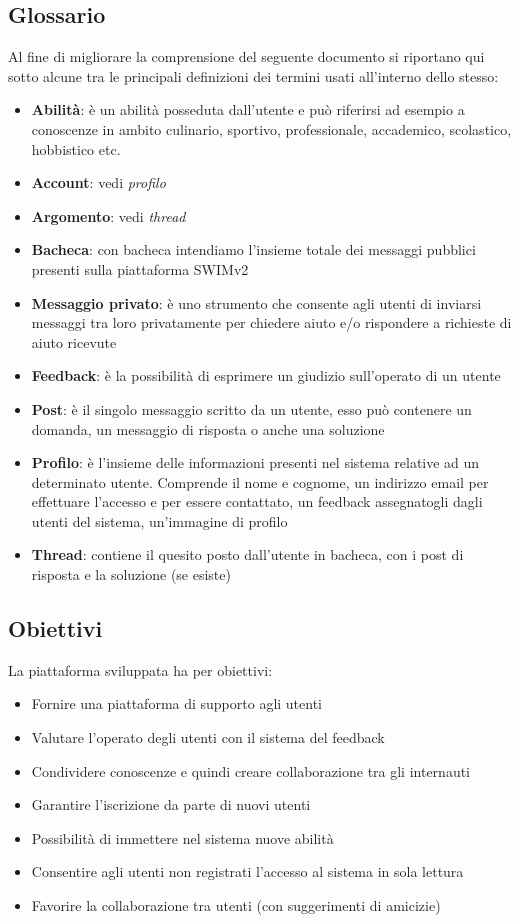 \documentclass[a4paper,12pt]{article}
\begin{document}
\subsection{Glossario}
Al fine di migliorare la comprensione del seguente documento si riportano qui sotto alcune tra le principali definizioni dei termini usati all’interno dello stesso:
\begin{itemize}
\itemsep0em
\item {\bfseries Abilità}:
è un abilità posseduta dall’utente e può riferirsi ad esempio a conoscenze in ambito culinario, sportivo, professionale, accademico, scolastico, hobbistico etc.
\item {\bfseries Account}: vedi \textit{profilo}
\item {\bfseries Argomento}: vedi \textit{thread}
\item {\bfseries Bacheca}:
con bacheca intendiamo l’insieme totale dei messaggi pubblici presenti sulla piattaforma SWIMv2
\item {\bfseries Messaggio privato}:
è uno strumento che consente agli utenti di inviarsi messaggi tra loro privatamente per chiedere aiuto e/o rispondere a richieste di aiuto ricevute
\item {\bfseries Feedback}:
è la possibilità di esprimere un giudizio sull’operato di un utente
\item {\bfseries Post}:
è il singolo messaggio scritto da un utente, esso può contenere un domanda, un messaggio di risposta o anche una soluzione
\item {\bfseries Profilo}:
è l’insieme delle informazioni presenti nel sistema relative ad un determinato utente. Comprende il nome e cognome, un indirizzo email per effettuare l’accesso e per essere contattato, un feedback assegnatogli dagli utenti del sistema, un’immagine di profilo
\item {\bfseries Thread}:
contiene il quesito posto dall’utente in bacheca, con i post di risposta e la soluzione (se esiste)
\end{itemize}

\subsection{Obiettivi}
La piattaforma sviluppata ha per obiettivi:
\begin{itemize}
\itemsep0em
\item Fornire una piattaforma di supporto agli utenti
\item Valutare l’operato degli utenti con il sistema del feedback
\item Condividere conoscenze e quindi creare collaborazione tra gli internauti
\item Garantire l’iscrizione da parte di nuovi utenti
\item Possibilità di immettere nel sistema nuove abilità
\item Consentire agli utenti non registrati l’accesso al sistema in sola lettura
\item Favorire la collaborazione tra utenti (con suggerimenti di amicizie)
\end{itemize}
\end{document}
